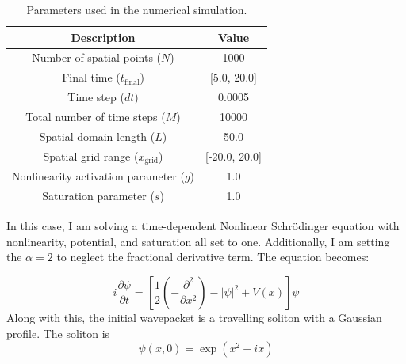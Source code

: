 \documentclass[8pt, a4paper, twocolumn]{article}
\begin{document}
\begin{table}[h!]
	\centering
	\begin{tabular}{c|c}
	\toprule
	\textbf{Description} & \textbf{Value}     \\ 
	\midrule
	Number of spatial points ($N$)              & 1000              \\ 
	Final time ($t_{\text{final}}$)             & [5.0, 20.0]       \\ 
	Time step ($dt$)                            & 0.0005            \\ 
	Total number of time steps ($M$)            & 10000             \\ 
	Spatial domain length ($L$)                 & 50.0              \\ 
	Spatial grid range ($x_{\text{grid}}$)      & [-20.0, 20.0]     \\
	Nonlinearity activation parameter ($g$)     & 1.0               \\
	Saturation parameter ($s$)                  & 1.0               \\
	\bottomrule
	\end{tabular}
	\caption{Parameters used in the numerical simulation.}
\end{table}

In this case, I am solving a time-dependent Nonlinear Schrödinger
equation with nonlinearity, potential, and saturation all set to one. Additionally, I am setting the
$\alpha = 2$ to neglect the fractional derivative term. The equation becomes:

\begin{equation}
	i \frac{\partial \psi}{\partial t} = \left[ \frac{1}{2} \left( - \frac{\partial^2}
	{\partial x^2}\right) - |\psi|^2 + V(x) \right] \psi
\end{equation}
Along with this, the initial wavepacket is a travelling soliton with a Gaussian profile. The 
soliton is
\begin{equation}
	\psi(x, 0) = \exp{(x^2 + ix)}
	\label{eq:initial_wavepacket}
\end{equation}
\end{document}
